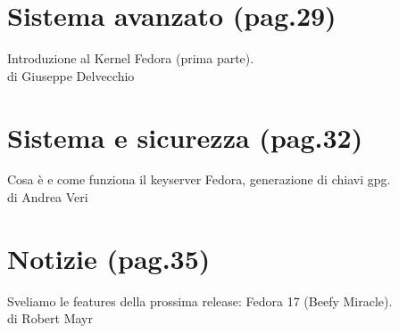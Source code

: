 \begin{titlepage}
\section*{\color[cmyk]{1, 0.57, 0, 0.38}Sistema avanzato {\scriptsize(pag.29)}} \label{sec:Decima}
Introduzione al Kernel Fedora (prima parte).\\ {\tiny di Giuseppe Delvecchio}
\section*{\color[cmyk]{1, 0.57, 0, 0.38}Sistema e sicurezza {\scriptsize(pag.32)}} \label{sec:Undicesima}
Cosa è e come funziona il keyserver Fedora, generazione di chiavi gpg.\\ {\tiny di Andrea Veri}
\section*{\color[cmyk]{1, 0.57, 0, 0.38}Notizie {\scriptsize(pag.35)}} \label{sec:Dodicesima}
Sveliamo le features della prossima release: Fedora 17 (Beefy Miracle).\\ {\tiny di Robert Mayr}
\end{titlepage}

